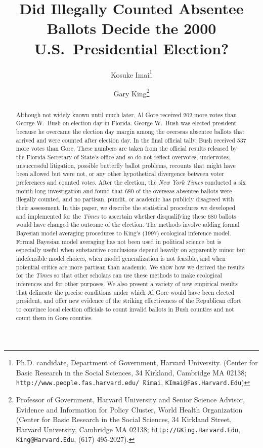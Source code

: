 \documentclass[11pt,titlepage]{article}
\title{Did Illegally Counted Absentee Ballots Decide the 2000 U.S.\ 
  Presidential Election?}
\author{Kosuke Imai\thanks{Ph.D. candidate, Department of Government,
    Harvard University. (Center for Basic Research in the Social
    Sciences, 34 Kirkland, Cambridge MA 02138;
    \texttt{http://www.people.fas.harvard.edu/\~\,kimai},
    \texttt{KImai@Fas.Harvard.Edu})}
\and %
Gary King\thanks{Professor of Government, Harvard University and
  Senior Science Advisor, Evidence and Information for Policy Cluster,
  World Health Organization (Center for Basic Research in the Social
  Sciences, 34 Kirkland Street, Harvard University, Cambridge MA
  02138; \texttt{http://GKing.Harvard.Edu}, \texttt{King@Harvard.Edu},
  (617) 495-2027).}  }
\begin{document}
\maketitle

\begin{abstract}
  Although not widely known until much later, Al Gore received 202
  more votes than George W.\ Bush on election day in Florida.  George
  W.\ Bush was elected president because he overcame the election day
  margin among the overseas absentee ballots that arrived and were
  counted after election day.  In the final official tally, Bush
  received 537 more votes than Gore.  These numbers are taken from the
  official results released by the Florida Secretary of State's office
  and so do not reflect overvotes, undervotes, unsuccessful
  litigation, possible butterfly ballot problems, recounts that might
  have been allowed but were not, or any other hypothetical divergence
  between voter preferences and counted votes.  After the election,
  the \emph{New York Times} conducted a six month long investigation
  and found that 680 of the overseas absentee ballots were illegally
  counted, and no partisan, pundit, or academic has publicly disagreed
  with their assessment.  In this paper, we describe the statistical
  procedures we developed and implemented for the \emph{Times} to
  ascertain whether disqualifying these 680 ballots would have changed
  the outcome of the election.  The methods involve adding formal
  Bayesian model averaging procedures to King's (1997) ecological
  inference model.  Formal Bayesian model averaging has not been used
  in political science but is especially useful when substantive
  conclusions depend heavily on apparently minor but indefensible
  model choices, when model generalization is not feasible, and when
  potential critics are more partisan than academic.  We show how we
  derived the results for the \emph{Times} so that other scholars can
  use these methods to make ecological inferences and for other
  purposes.  We also present a variety of new empirical results that
  delineate the precise conditions under which Al Gore would have been
  elected president, and offer new evidence of the striking
  effectiveness of the Republican effort to convince local election
  officials to count invalid ballots in Bush counties and not count
  them in Gore counties.
\end{abstract}

\end{document}
